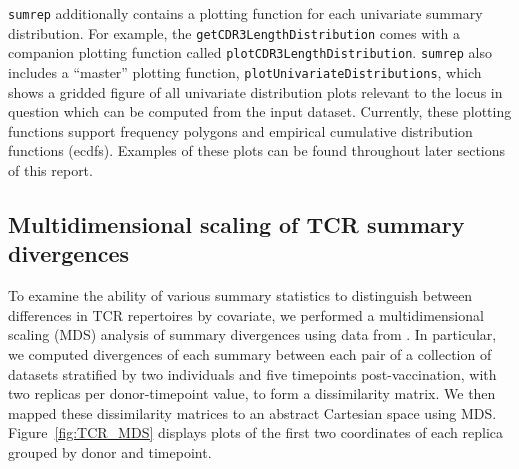 \documentclass{article}
\begin{document}
\texttt{sumrep} additionally contains a plotting function for each univariate summary distribution.
For example, the \texttt{getCDR3LengthDistribution} comes with a companion plotting function called \texttt{plotCDR3LengthDistribution}.
\texttt{sumrep} also includes a ``master'' plotting function, \texttt{plotUnivariateDistributions}, which shows a gridded figure of all univariate distribution plots relevant to the locus in question which can be computed from the input dataset.
Currently, these plotting functions support frequency polygons and empirical cumulative distribution functions (ecdfs).
Examples of these plots can be found throughout later sections of this report.

\subsection*{Multidimensional scaling of TCR summary divergences}
To examine the ability of various summary statistics to distinguish between differences in TCR repertoires by covariate, we performed a multidimensional scaling (MDS) analysis of summary divergences using data from \cite{Pogorelyy2018-ak}.
In particular, we computed divergences of each summary between each pair of a collection of datasets stratified by two individuals and five timepoints post-vaccination, with two replicas per donor-timepoint value, to form a dissimilarity matrix.
We then mapped these dissimilarity matrices to an abstract Cartesian space using MDS.
Figure~\ref{fig:TCR_MDS} displays plots of the first two coordinates of each replica grouped by donor and timepoint.
\end{document}
